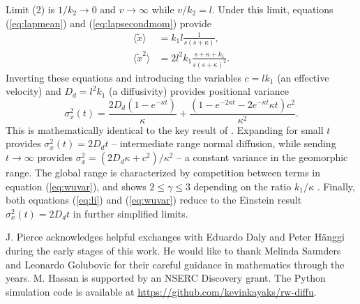 \documentclass[draft,grl]{agujournal2018}
\newcommand\be{\begin{equation}}
\newcommand\ee{\end{equation}}
\newcommand\bra{\langle}
\newcommand\ket{\rangle}
\begin{document}
Limit (2) is $1/k_2 \rightarrow 0$ and $v\rightarrow \infty$ while $v/k_2 = l$. Under this limit, equations (\ref{eq:lapmean}) and (\ref{eq:lapsecondmom}) provide
\begin{align}
\bra \tilde{x} \ket &= k_1l\frac{1}{s(s+\kappa)},\\
\bra \tilde{x}^2 \ket &= 2l^2k_1 \frac{s+\kappa+k_1}{s(s+\kappa)^2}.
\end{align}
Inverting these equations and introducing the variables $c=lk_1$ (an effective velocity) and $D_d = l^2k_1$ (a diffusivity) provides positional variance
\be \sigma_x^2(t) = \frac{2D_d(1-e^{-\kappa t})}{\kappa} + \frac{(1-e^{-2\kappa t}-2e^{-\kappa t}\kappa t)c^2}{\kappa^2}. \label{eq:wuvar}\ee
This is mathematically identical to the key result of \citet{Wu2019}.
Expanding for small $t$ provides $\sigma_x^2(t) = 2D_d t$ -- intermediate range normal diffusion, while sending $t\rightarrow \infty$ provides $\sigma_x^2 = (2D_d\kappa + c^2)/\kappa^2$ -- a constant variance in the geomorphic range.
The global range is characterized by competition between terms in equation (\ref{eq:wuvar}), and shows $2 \leq \gamma \leq 3$ depending on the ratio $k_1/\kappa$ \citep[cf.,][]{Wu2019}.
Finally, both equations (\ref{eq:li}) and (\ref{eq:wuvar}) reduce to the Einstein result $\sigma_x^2(t) = 2D_d t$ in further simplified limits.

\acknowledgments
J. Pierce acknowledges helpful exchanges with Eduardo Daly and Peter H{\"a}nggi during the early stages of this work. He would like to thank Melinda Saunders and Leonardo Golubovic for their careful guidance in mathematics through the years. M. Hassan is supported by an NSERC Discovery grant. The Python simulation code is available at \sloppy
\url{https://github.com/kevinkayaks/rw-diffu}.


\end{document}
